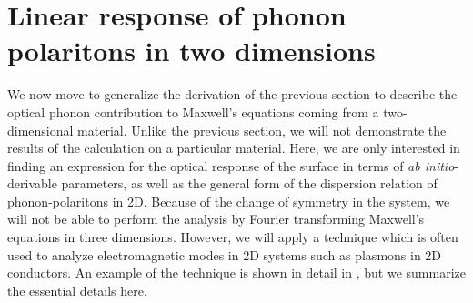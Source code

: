 \documentclass[aps,prb,twocolumn,
	groupedaddress,superscriptaddress,
	amsfonts,amssymb,amsmath,floatfix,
	citeautoscript]{revtex4-1}
\begin{document}

\section{Linear response of phonon polaritons in two dimensions}
We now move to generalize the derivation of the previous section to describe the optical phonon contribution to Maxwell's equations coming from a two-dimensional material. Unlike the previous section, we will not demonstrate the results of the calculation on a particular material. Here, we are only interested in finding an expression for the optical response of the surface in terms of \emph{ab initio}-derivable parameters, as well as the general form of the dispersion relation of phonon-polaritons in 2D.  Because of the change of symmetry in the system, we will not be able to perform the analysis by Fourier transforming Maxwell's equations in three dimensions. However, we will apply a technique which is often used to analyze electromagnetic modes in 2D systems such as plasmons in 2D conductors. An example of the technique is shown in detail in \cite{jablan2009plasmonics}, but we summarize the essential details here. 
\end{document}
